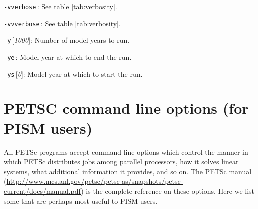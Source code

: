 \documentclass[11pt,final]{amsart}
\newcommand{\rawopt}[1]{\vspace{1mm}\noindent \large\texttt{-#1}\normalsize}
\newcommand{\opt}[1]{\rawopt{#1}\,:\quad}
\newcommand{\optdef}[2]{\rawopt{#1}\,[\textsl{#2}]:\quad}
\newcommand{\optrestrict}[2]{\rawopt{#1}\,[\texttt{#2} \textsl{only}]:\quad}
\newcommand{\optdefrestrict}[3]{\rawopt{#1}\,[\textsl{#2}]\,[\texttt{#3} \textsl{only}]:\quad}
\newcommand{\und}{$\underline{\,\,\,}$}
\begin{document}
\opt{vverbose}   See table \ref{tab:verbosity}.

\opt{vvverbose}   See table \ref{tab:verbosity}.

\optdef{y}{1000} Number of model years to run.

\opt{ye} Model year at which to end the run.

\optdef{ys}{0} Model year at which to start the run.

\clearpage\newpage
\section{PETSC command line options (for PISM users)}  All PETSc programs accept command line options which control the manner in which PETSc distributes jobs among parallel processors, how it solves linear systems, what additional information it provides, and so on.  The PETSc manual (\url{http://www.mcs.anl.gov/petsc/petsc-as/snapshots/petsc-current/docs/manual.pdf}) is the complete reference on these options.  Here we list some that are perhaps most useful to PISM users.
\end{document}
